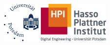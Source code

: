 \pagestyle{empty}
\frontmatter

\vphantom{hack}%
{%
\vspace{3cm}
\begin{center}
\noindent\includegraphics[height=20mm]{layout/up}\hspace{2cm}
\includegraphics[height=20mm]{layout/hpi}

\vspace{1.7cm}
\par 
\vspace{1cm}
\end{center}
}
\cleardoublepage

